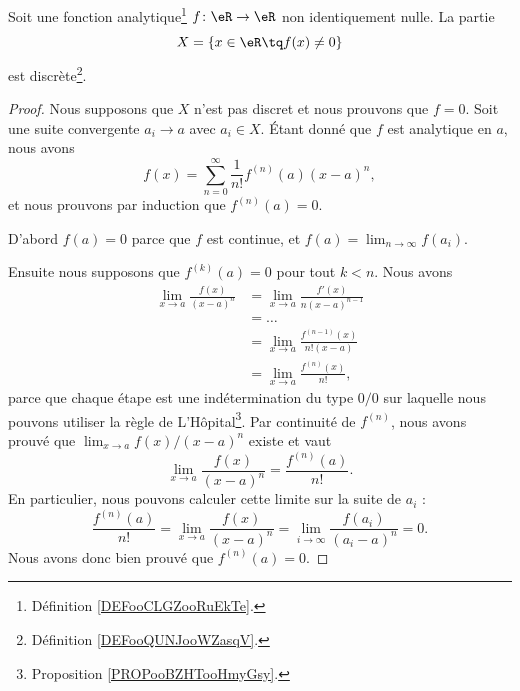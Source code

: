 \begin{theorem}	\label{THOooEAYXooTvVYXN}
	Soit une fonction analytique\footnote{Définition \ref{DEFooCLGZooRuEkTe}.} \(f \colon \eR\to \eR  \) non identiquement nulle. La partie
	\begin{equation}
		X=\{ x\in \eR\tq f(x)\neq 0 \}
	\end{equation}
	est discrète\footnote{Définition \ref{DEFooQUNJooWZasqV}.}.
\end{theorem}

\begin{proof}
	Nous supposons que \( X\) n'est pas discret et nous prouvons que \( f=0\). Soit une suite convergente \( a_i\to a\) avec \( a_i\in X\). Étant donné que \( f\) est analytique en \( a\), nous avons
	\begin{equation}
		f(x)=\sum_{n=0}^{\infty}\frac{1}{ n!}f^{(n)}(a)(x-a)^n,
	\end{equation}
	et nous prouvons par induction que \( f^{(n)}(a)=0\).

	D'abord \( f(a)=0\) parce que \( f\) est continue, et \( f(a)=\lim_{n\to\infty}f(a_i)\).

	Ensuite nous supposons que \( f^{(k)}(a)=0\) pour tout \( k<n\). Nous avons
	\begin{subequations}
		\begin{align}
			\lim_{x\to a}\frac{ f(x) }{ (x-a)^n } & = \lim_{x\to a}\frac{ f'(x) }{ n(x-a)^{n-1} }   \\
			                                      & = \ldots                                        \\
			                                      & = \lim_{x\to a}\frac{ f^{(n-1)}(x) }{ n!(x-a) } \\
			                                      & = \lim_{x\to a}\frac{ f^{(n)}(x) }{ n! },
		\end{align}
	\end{subequations}
	parce que chaque étape est une indétermination du type \( 0/0\) sur laquelle nous pouvons utiliser la règle de L'Hôpital\footnote{Proposition \ref{PROPooBZHTooHmyGsy}.}. Par continuité de \( f^{(n)}\), nous avons prouvé que \( \lim_{x\to a}f(x)/(x-a)^n\) existe et vaut
	\begin{equation}
		\lim_{x\to a}\frac{ f(x) }{ (x-a)^n }=\frac{ f^{(n)}(a) }{ n! }.
	\end{equation}
	En particulier, nous pouvons calculer cette limite sur la suite de \( a_i\) :
	\begin{equation}
		\frac{ f^{(n)}(a) }{ n! }=\lim_{x\to a}\frac{ f(x) }{ (x-a)^n }=\lim_{i\to \infty}\frac{ f(a_i) }{ (a_i-a)^n }=0.
	\end{equation}
	Nous avons donc bien prouvé que \( f^{(n)}(a)=0\).
\end{proof}
